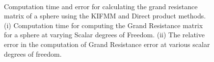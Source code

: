 \begin{figure}[ht]
\begin{subfigure}[b]{0.49\textwidth}
         \caption{\label{fig:NodeCapError}}
     \end{subfigure} \\
        \caption[Computation time and error for calculating the grand resistance matrix of a sphere using the KIFMM and Direct product methods.]{Computation time and error for calculating the grand resistance matrix of a sphere using the KIFMM and Direct product methods. (i) Computation time for computing the Grand Resistance matrix for a sphere at varying Scalar degrees of Freedom. (ii) The relative error in the computation of Grand Resistance error at various scalar degrees of freedom.}
        \label{fig:NodeCap}
\end{figure}
